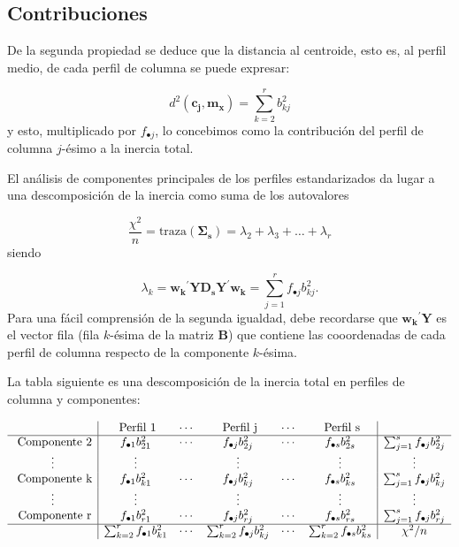 \documentclass[
  a4paper,
  oneside]{scrbook}
\theoremstyle{definition}
\theoremstyle{definition}
\theoremstyle{definition}
\theoremstyle{definition}
\theoremstyle{remark}
\begin{document}
\subsection{Contribuciones}\label{contribuciones-2}

De la segunda propiedad se deduce que la distancia al centroide, esto
es, al perfil medio, de cada perfil de columna se puede expresar:

\[d^2(\bm{c_j},\bm{m_x})=\sum_{k=2}^r b_{k j}^2\] y esto, multiplicado
por \(f_{\bullet j}\), lo concebimos como la contribución del perfil de
columna \(j\)-ésimo a la inercia total.

El análisis de componentes principales de los perfiles estandarizados da
lugar a una descomposición de la inercia como suma de los autovalores

\[\frac{\chi^2}{n}=\mbox{traza}(\bm{\Sigma_s})=\lambda_2+\lambda_3+\ldots+\lambda_r\]
siendo

\[\lambda_k = \bm{w_k}^{\prime} \bm{Y D_s Y^{\prime}} \bm{w_k} = \sum_{j=1}^r f_{\bullet j} b_{kj}^2.\]
Para una fácil comprensión de la segunda igualdad, debe recordarse que
\(\bm{w_k}^{\prime}\bm{Y}\) es el vector fila (fila \(k\)-ésima de la matriz
\(\bm{B}\)) que contiene las cooordenadas de cada perfil de columna
respecto de la componente \(k\)-ésima.

La tabla siguiente es una descomposición de la inercia total en perfiles
de columna y componentes:

\[\begin{array}{c|ccccc|c}
 & \mbox{ Perfil 1} &  \cdots & \mbox{ Perfil j} & \cdots
  & \mbox{ Perfil s} & \\ \hline
\mbox{ Componente 2}
 & f_{\bullet 1} b_{21}^2 &  \cdots & f_{\bullet j} b_{2j}^2
& \cdots & f_{\bullet s} b_{2s}^2 & \sum_{j=1}^s f_{\bullet j} b_{2j}^2 \\
\vdots & \vdots &  & \vdots & & \vdots & \vdots \\
\mbox{ Componente k}
 & f_{\bullet 1} b_{k1}^2 &  \cdots & f_{\bullet j} b_{kj}^2
& \cdots & f_{\bullet s} b_{ks}^2 & \sum_{j=1}^s f_{\bullet j} b_{kj}^2 \\
\vdots & \vdots &  & \vdots & & \vdots & \vdots \\
\mbox{ Componente r}
 & f_{\bullet 1} b_{r1}^2 &  \cdots & f_{\bullet j} b_{rj}^2
& \cdots & f_{\bullet s} b_{rs}^2 & \sum_{j=1}^s f_{\bullet j} b_{rj}^2 \\
\hline & \sum_{k=2}^r f_{\bullet 1} b_{k 1}^2 & \cdots
 & \sum_{k=2}^r f_{\bullet j} b_{k j}^2
& \cdots & \sum_{k=2}^r f_{\bullet s} b_{k s}^2 & \chi^2/n \end{array}\]
\end{document}
